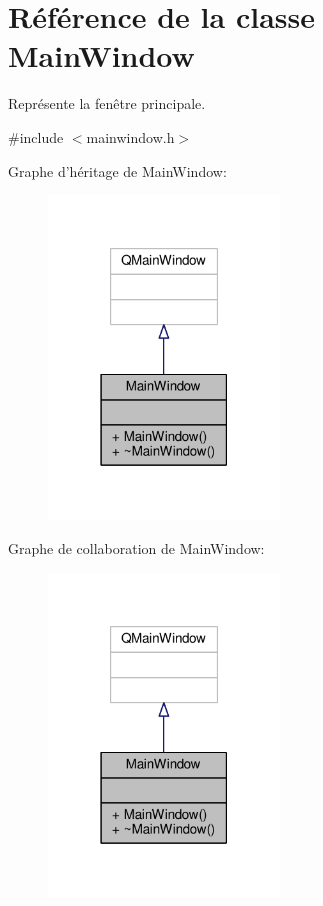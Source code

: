 \hypertarget{classMainWindow}{\section{Référence de la classe Main\+Window}
\label{classMainWindow}
}


Représente la fenêtre principale.  




{\ttfamily \#include $<$mainwindow.\+h$>$}



Graphe d'héritage de Main\+Window\+:
\nopagebreak
\begin{figure}[H]
\begin{center}
\leavevmode
\includegraphics[width=174pt]{d1/d96/classMainWindow__inherit__graph}
\end{center}
\end{figure}


Graphe de collaboration de Main\+Window\+:
\nopagebreak
\begin{figure}[H]
\begin{center}
\leavevmode
\includegraphics[width=174pt]{d2/d38/classMainWindow__coll__graph}
\end{center}
\end{figure}

